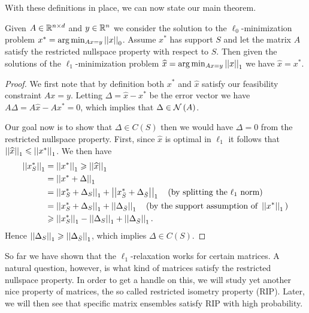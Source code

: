\documentclass[11pt]{article}
\begin{document}
With these definitions in place, we can now state our main theorem.

\begin{theorem}
    Given \(A \in \mathbb R^{n\times d}\) and \(y\in\mathbb R^n\) we consider the solution to the \(\ell_0\)-minimization problem \(x^\ast=\arg\min_{A x=y}\left|\left|x\right|\right|_{0}\). Assume \(x^\ast\) has support \(S\) and let the matrix \(A\) satisfy the restricted nullspace property with respect to \(S\). Then given the solutions of the \(\ell_1\)-minimization problem \(\widehat{x}=\arg\min_{A x=y}\left|\left|x\right|\right|_{1}\) we have \(\widehat{x}=x^\ast\).
\end{theorem}

\begin{proof}
We first note that by definition both \(x^\ast\) and \(\widehat{x}\) satisfy our feasibility constraint \(A x=y\). Letting \(\Delta=\widehat{x}-x^\ast\) be the error vector we have \(A \Delta=A \widehat{x}-A x^\ast=0\), which implies that \(\Delta\in\mathcal N\left(A\right)\).

Our goal now is to show that \(\Delta\in C(S)\) then we would have \(\Delta=0\) from the restricted nullspace property. First, since \(\widehat{x}\) is optimal in \(\ell_1\) it follows that \(\left|\left|\widehat x\right|\right|_1\leqslant\left|\left|x^\ast\right|\right|_1\). We then have
\[\begin{aligned}
    \left|\left|x^\ast_S\right|\right|_1 &= \left|\left|x^\ast\right|\right|_1\geqslant \left|\left|\widehat x\right|\right|_1\\
    &= \left|\left|x^\ast+\Delta\right|\right|_1\\
    &= \left|\left|x^\ast_S+\Delta_S\right|\right|_1+\left|\left|x^\ast_{\bar S}+\Delta_{\bar S}\right|\right|_1\quad\textnormal{(by splitting the }\ell_1\textnormal{ norm)}\\
    &= \left|\left|x^\ast_S+\Delta_S\right|\right|_1+\left|\left|\Delta_{\bar S}\right|\right|_1\quad\textnormal{(by the support assumption of }\left|\left|x^\ast\right|\right|_1\textnormal{)}\\
    &\geqslant \left|\left|x^\ast_S\right|\right|_1-\left|\left|\Delta_S\right|\right|_1+\left|\left|\Delta_{\bar S}\right|\right|_1.
\end{aligned}\]
Hence \(\left|\left|\Delta_S\right|\right|_1\geqslant\left|\left|\Delta_{\bar S}\right|\right|_1\), which implies \(\Delta\in C(S)\).
\end{proof}

So far we have shown that the \(\ell_1\)-relaxation works for certain matrices. A natural question, however, is what kind of matrices satisfy the restricted nullspace property. In order to get a handle on this, we will study yet another nice property of matrices, the so called restricted isometry property (RIP). Later, we will then see that specific matrix ensembles satisfy RIP with high probability.
\end{document}
